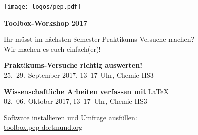 \documentclass[paper=landscape]{scrartcl}
\begin{document}
  
  \begin{minipage}{0.25\textwidth}%
    \texttt{[image: logos/pep.pdf]}%
  \end{minipage}%
  \begin{minipage}{0.75\textwidth}%
    \centering\fontsize{50}{60}\bfseries\selectfont Toolbox-Workshop 2017%
  \end{minipage}%

  \vspace{0.5cm}

  \begin{center}
    \Huge Ihr müsst im nächsten Semester Praktikums-Versuche machen? \\[0.5\baselineskip]
    Wir machen es euch einfach(er)!
  \end{center}
  
  \vspace{0.5cm}

  \begin{center}
    \huge \textbf{Praktikums-Versuche richtig auswerten!} \\[0.5\baselineskip]
    25.–29.~September 2017, 13–17~Uhr, Chemie HS3
  \end{center}
  \vspace{0.5cm}
  \begin{center}
    \huge \textbf{Wissenschaftliche Arbeiten verfassen mit} \textrm{\LaTeX}\\[0.5\baselineskip]
    02.–06.~Oktober 2017, 13–17~Uhr, Chemie HS3
  \end{center}
  \vspace{0.5cm}
  \begin{center}
    \large Software installieren und Umfrage ausfüllen: \\
    \Huge \href{https://toolbox.pep-dortmund.org}{toolbox.pep-dortmund.org}
  \end{center}

\end{document}
